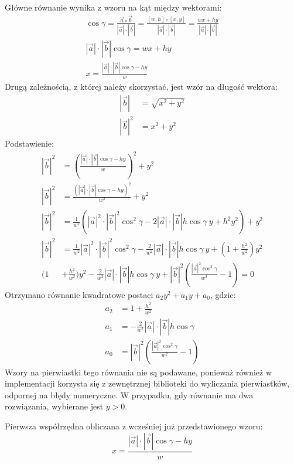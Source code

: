Główne równanie wynika z wzoru na kąt między wektorami:
\begin{gather*}
\cos \gamma = \frac{\vec{a}\circ\vec{b}}{|\vec{a}|\cdot |\vec{b}|} = \frac{[w, h]\circ[x, y]}{|\vec{a}|\cdot |\vec{b}|} = \frac{wx + hy}{|\vec{a}|\cdot |\vec{b}|} \\[1em]
|\vec{a}|\cdot |\vec{b}| \cos \gamma = wx + hy \\[1em]
x = \frac{|\vec{a}|\cdot |\vec{b}| \cos \gamma - hy}{w}
\end{gather*}
Drugą zależnością, z której należy skorzystać, jest wzór na długość wektora:
\begin{align*}
|\vec{b}| &= \sqrt{x^2 + y^2} \\
|\vec{b}|^2 &= x^2 + y^2
\end{align*}
Podstawienie:
\begin{align*}
|\vec{b}|^2 &= \left(\frac{|\vec{a}|\cdot |\vec{b}| \cos \gamma - hy}{w}\right)^2 + y^2 \\ 
|\vec{b}|^2 &= \frac{(|\vec{a}|\cdot |\vec{b}| \cos \gamma - hy)^2}{w^2} + y^2 \\ 
|\vec{b}|^2 &= \frac{1}{w^2}\left(|\vec{a}|^2\cdot |\vec{b}|^2 \cos^2 \gamma - 2|\vec{a}|\cdot |\vec{b}|h \cos \gamma\ y + h^2 y^2\right) + y^2 \\ 
|\vec{b}|^2 &= \frac{1}{w^2}|\vec{a}|^2\cdot |\vec{b}|^2 \cos^2 \gamma - \frac{2}{w^2}|\vec{a}|\cdot |\vec{b}|h \cos \gamma\ y + \left(1 + \frac{h^2}{w^2}\right) y^2 \\
\bigg(1 &+ \frac{h^2}{w^2}\bigg)  y^2 - \frac{2}{w^2}|\vec{a}|\cdot |\vec{b}|h \cos \gamma\ y + |\vec{b}|^2\left(\frac{|\vec{a}|^2 \cos^2 \gamma}{w^2} - 1 \right) = 0
\end{align*}
Otrzymano równanie kwadratowe postaci $a_2y^2 + a_1y + a_0$, gdzie:
\begin{align*}
a_2 &= 1 + \frac{h^2}{w^2} \\
a_1 &= -\frac{2}{w^2}|\vec{a}|\cdot |\vec{b}|h \cos \gamma \\
a_0 &= |\vec{b}|^2\left(\frac{|\vec{a}|^2 \cos^2 \gamma}{w^2} - 1 \right)
\end{align*}
Wzory na pierwiastki tego równania nie są podawane, ponieważ również w implementacji korzysta się z zewnętrznej biblioteki do wyliczania pierwiastków, odpornej na błędy numeryczne. W przypadku, gdy równanie ma dwa rozwiązania, wybierane jest $y >0$.

Pierwsza współrzędna obliczana z wcześniej już przedstawionego wzoru:
$$
x = \frac{|\vec{a}|\cdot |\vec{b}| \cos \gamma - hy}{w}
$$

